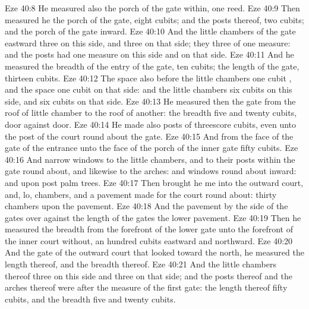 \vs Eze 40:8 He measured also the porch of the gate within, one reed.
\vs Eze 40:9 Then measured he the porch of the gate, eight cubits; and the posts thereof, two cubits; and the porch of the gate  inward.
\vs Eze 40:10 And the little chambers of the gate eastward  three on this side, and three on that side; they three  of one measure: and the posts had one measure on this side and on that side.
\vs Eze 40:11 And he measured the breadth of the entry of the gate, ten cubits;  the length of the gate, thirteen cubits.
\vs Eze 40:12 The space also before the little chambers  one cubit , and the space  one cubit on that side: and the little chambers  six cubits on this side, and six cubits on that side.
\vs Eze 40:13 He measured then the gate from the roof of  little chamber to the roof of another: the breadth  five and twenty cubits, door against door.
\vs Eze 40:14 He made also posts of threescore cubits, even unto the post of the court round about the gate.
\vs Eze 40:15 And from the face of the gate of the entrance unto the face of the porch of the inner gate  fifty cubits.
\vs Eze 40:16 And  narrow windows to the little chambers, and to their posts within the gate round about, and likewise to the arches: and windows  round about inward: and upon  post  palm trees.
\vs Eze 40:17 Then brought he me into the outward court, and, lo,  chambers, and a pavement made for the court round about: thirty chambers  upon the pavement.
\vs Eze 40:18 And the pavement by the side of the gates over against the length of the gates  the lower pavement.
\vs Eze 40:19 Then he measured the breadth from the forefront of the lower gate unto the forefront of the inner court without, an hundred cubits eastward and northward.
\vs Eze 40:20 And the gate of the outward court that looked toward the north, he measured the length thereof, and the breadth thereof.
\vs Eze 40:21 And the little chambers thereof  three on this side and three on that side; and the posts thereof and the arches thereof were after the measure of the first gate: the length thereof  fifty cubits, and the breadth five and twenty cubits.
